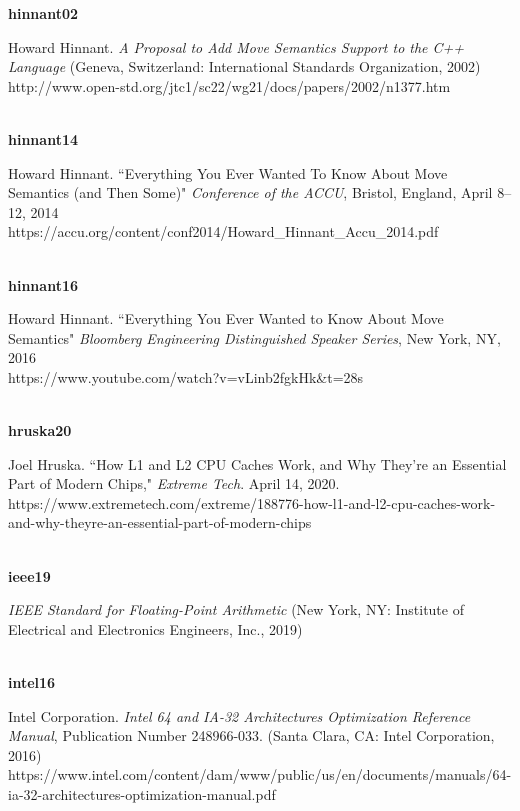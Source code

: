 \noindent\textbf{hinnant02}\\
\hspace*{2em}\parbox[t]{\textwidth}{Howard Hinnant. \textit{A Proposal to Add Move Semantics Support to the C++ Language} (Geneva, Switzerland: International Standards Organization, 2002)\\
http://www.open-std.org/jtc1/sc22/wg21/docs/papers/2002/n1377.htm}\\

\noindent\textbf{hinnant14}\\
\hspace*{2em}\parbox[t]{\textwidth}{Howard Hinnant. ``Everything You Ever Wanted To Know About Move Semantics (and Then Some)" \textit{Conference of the ACCU}, Bristol, England, April 8--12, 2014\\
https://accu.org/content/conf2014/Howard\_Hinnant\_Accu\_2014.pdf}\\

\noindent\textbf{hinnant16}\\
\hspace*{2em}\parbox[t]{\textwidth}{Howard Hinnant. ``Everything You Ever Wanted to Know About Move Semantics" \textit{Bloomberg Engineering Distinguished Speaker Series}, New York, NY, 2016\\
https://www.youtube.com/watch?v=vLinb2fgkHk\&t=28s }\\

\noindent\textbf{hruska20}\\
\hspace*{2em}\parbox[t]{\textwidth}{Joel Hruska. ``How L1 and L2 CPU Caches Work, and Why They’re an Essential Part of Modern Chips," \textit{Extreme Tech}. April 14, 2020.\\
https://www.extremetech.com/extreme/188776-how-l1-and-l2-cpu-caches-work-and-why-theyre-an-essential-part-of-modern-chips}\\

\noindent\textbf{ieee19}\\
\hspace*{2em}\parbox[t]{\textwidth}{\textit{IEEE Standard for Floating-Point Arithmetic} (New York, NY: Institute of Electrical and Electronics Engineers, Inc., 2019)}\\

\noindent\textbf{intel16}\\
\hspace*{2em}\parbox[t]{\textwidth}{Intel Corporation. \textit{Intel 64 and IA-32 Architectures Optimization Reference Manual}, Publication Number 248966-033. (Santa Clara, CA: Intel Corporation, 2016)\\
https://www.intel.com/content/dam/www/public/us/en/documents/manuals/64-ia-32-architectures-optimization-manual.pdf}\\

